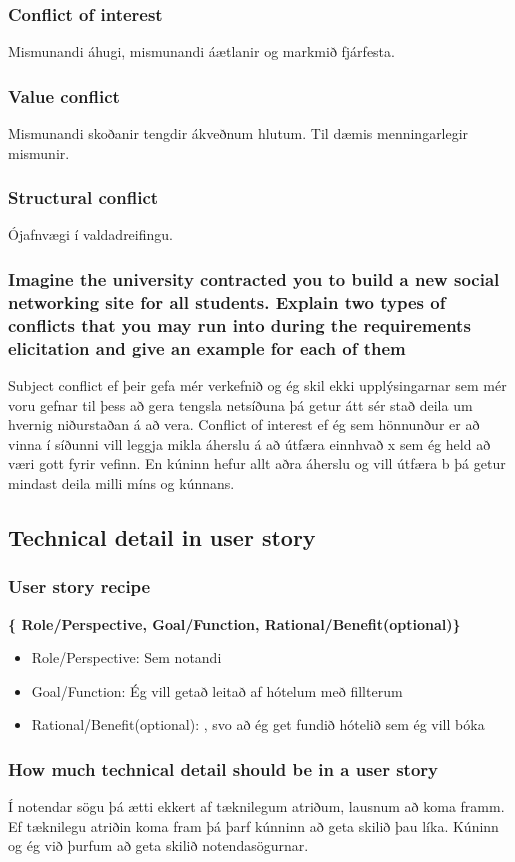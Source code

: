 \documentclass[openany]{article}
\begin{document}
\subsubsection{Conflict of interest}
Mismunandi áhugi, mismunandi áætlanir og markmið fjárfesta.
\subsubsection{Value conflict}
Mismunandi skoðanir tengdir ákveðnum hlutum. Til dæmis menningarlegir mismunir.
\subsubsection{Structural conflict}
Ójafnvægi í valdadreifingu.
\subsubsection{Imagine the university contracted you to build a new social networking site for all students. Explain two types of conflicts that you may run into during the requirements elicitation and give an example for each of them}
Subject conflict ef þeir gefa mér verkefnið og ég skil ekki upplýsingarnar sem mér voru gefnar til þess að gera tengsla netsíðuna þá getur átt sér stað deila um hvernig niðurstaðan á að vera. Conflict of interest ef ég sem hönnunður er að vinna í síðunni vill leggja mikla áherslu á að útfæra einnhvað x sem ég held að væri gott fyrir vefinn. En kúninn hefur allt aðra áherslu og vill útfæra b þá getur mindast deila milli míns og kúnnans.
\subsection{Technical detail in user story}
\subsubsection{User story recipe}
\textbf{ \{ Role/Perspective, Goal/Function, Rational/Benefit(optional)\}}
\begin{itemize}
	\item Role/Perspective: Sem notandi
	\item Goal/Function: Ég vill getað leitað af hótelum með fillterum
	\item Rational/Benefit(optional): , svo að ég get fundið hótelið sem ég vill bóka
\end{itemize}
\subsubsection{How much technical detail should be in a user story}
Í notendar sögu þá ætti ekkert af tæknilegum atriðum, lausnum að koma framm. Ef tæknilegu atriðin koma fram þá þarf kúnninn að geta skilið þau líka. Kúninn og ég við þurfum að geta skilið notendasögurnar.
\end{document}

